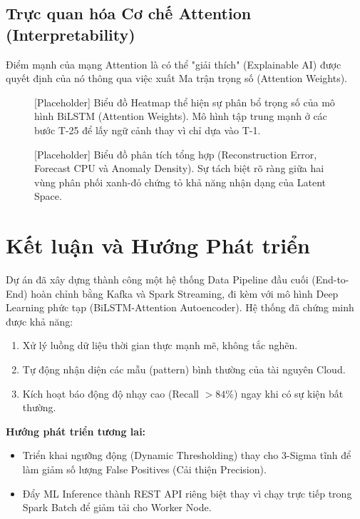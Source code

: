 \documentclass[12pt,a4paper]{article}
\begin{document}
\subsection{Trực quan hóa Cơ chế Attention (Interpretability)}
Điểm mạnh của mạng Attention là có thể "giải thích" (Explainable AI) được quyết định của nó thông qua việc xuất Ma trận trọng số (Attention Weights).

\begin{figure}[H]
    \centering
    \caption{[Placeholder] Biểu đồ Heatmap thể hiện sự phân bổ trọng số của mô hình BiLSTM (Attention Weights). Mô hình tập trung mạnh ở các bước T-25 để lấy ngữ cảnh thay vì chỉ dựa vào T-1.}
    \label{fig:attention}
\end{figure}

\begin{figure}[H]
    \centering
    \caption{[Placeholder] Biểu đồ phân tích tổng hợp (Reconstruction Error, Forecast CPU và Anomaly Density). Sự tách biệt rõ ràng giữa hai vùng phân phối xanh-đỏ chứng tỏ khả năng nhận dạng của Latent Space.}
    \label{fig:analysis}
\end{figure}

\section{Kết luận và Hướng Phát triển}

Dự án đã xây dựng thành công một hệ thống Data Pipeline đầu cuối (End-to-End) hoàn chỉnh bằng Kafka và Spark Streaming, đi kèm với mô hình Deep Learning phức tạp (BiLSTM-Attention Autoencoder). Hệ thống đã chứng minh được khả năng:
\begin{enumerate}
    \item Xử lý luồng dữ liệu thời gian thực mạnh mẽ, không tắc nghẽn.
    \item Tự động nhận diện các mẫu (pattern) bình thường của tài nguyên Cloud.
    \item Kích hoạt báo động độ nhạy cao (Recall $>84\%$) ngay khi có sự kiện bất thường.
\end{enumerate}

\textbf{Hướng phát triển tương lai:}
\begin{itemize}
    \item Triển khai ngưỡng động (Dynamic Thresholding) thay cho 3-Sigma tĩnh để làm giảm số lượng False Positives (Cải thiện Precision).
    \item Đẩy ML Inference thành REST API riêng biệt thay vì chạy trực tiếp trong Spark Batch để giảm tải cho Worker Node.
\end{itemize}
\end{document}
